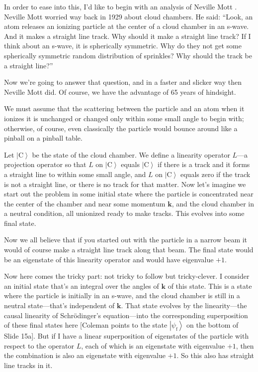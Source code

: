 \documentclass[12pt,nofootinbib]{revtex4}
\newcommand{\bs}[1]{\boldsymbol{#1}}
\newcommand{\ket}[1]{\left|#1\right\rangle}
\begin{document}
In order to ease into this, I'd like to begin with an analysis of Neville Mott \cite{mott29prsla79}. Neville Mott worried way back in 1929 about cloud chambers. He said: ``Look, an atom releases an ionizing particle at the center of a cloud chamber in an s-wave. And it makes a straight line track. Why should it make a straight line track? If I think about an s-wave, it is spherically symmetric. Why do they not get some spherically symmetric random distribution of sprinkles? Why should the track be a straight line?''

Now we're going to answer that question, and in a faster and slicker way then Neville Mott did. Of course, we have the advantage of 65 years of hindsight.

We must assume that the scattering between the particle and an atom when it ionizes it is unchanged or changed only within some small angle to begin with; otherwise, of course, even classically the particle would bounce around like a pinball on a pinball table.

Let $\ket{\text{C}}$ be the state of the cloud chamber. We define a linearity operator $L$---a projection operator so that
$L$ on $\ket{\text{C}}$ equals $\ket{\text{C}}$
if there is a track and it forms a straight line to within some small angle, and $L$ on $\ket{\text{C}}$ equals zero
if the track is not a straight line, or there is no track for that matter.
Now let's imagine we start out the problem in some initial state where the particle is concentrated near the center of the chamber and near some momentum $\bs{k}$, and the cloud chamber in a neutral condition, all unionized ready to make tracks. This evolves into some final state.

Now we all believe that if you started out with the particle in a narrow beam it would of course make a straight line track along that beam. The final state would be an eigenstate of this linearity operator and would have eigenvalue $+1$.

Now here comes the tricky part: not tricky to follow but tricky-clever. I consider an initial state that's an integral over the angles of $\bs{k}$ of this state. This is a state where the particle is initially in an s-wave, and the cloud chamber is still in a neutral state---that's independent of $\bs{k}$. That state evolves by the linearity---the causal linearity of Schrödinger's equation---into the corresponding superposition of these final states here [Coleman points to the state
$\ket{\psi_{\text{f}}}$ on the bottom of Slide 15a]. But if I have a linear superposition of eigenstates of the particle with respect to the operator $L$, each of which is an eigenstate with eigenvalue $+1$, then the combination is also an eigenstate with eigenvalue $+1$. So this also has straight line tracks in it.
\end{document}
